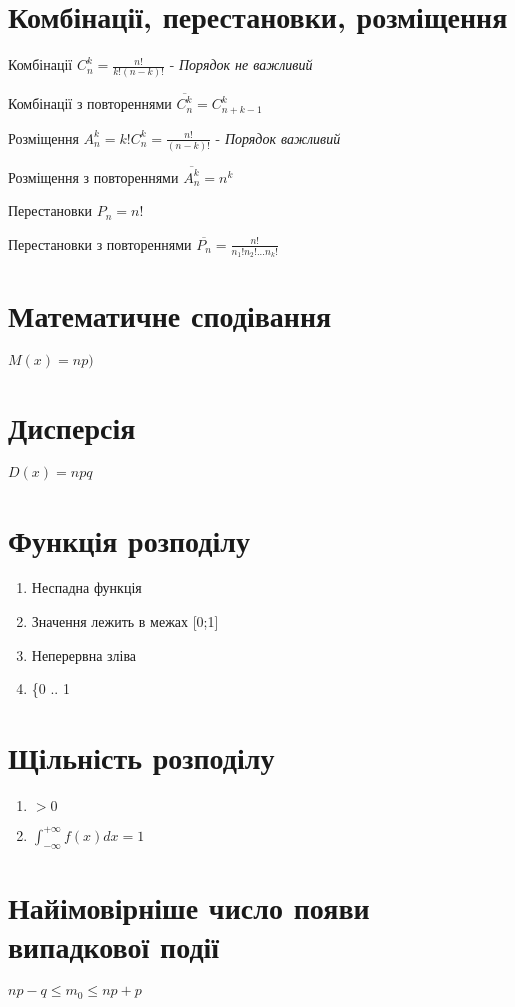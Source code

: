 \documentclass{article}
\begin{document}
\begin{Large}
\section*{Комбінації, перестановки, розміщення}
\begin{list}{-}{}
	\item Комбінації $C_n^k=\frac{n!}{k!(n-k)!}$ - \textit{Порядок не важливий}
	\item Комбінації з повтореннями $\overline{C_n^k}=C_{n+k-1}^k$
	\item Розміщення $A_n^k=k!C_n^k=\frac{n!}{(n-k)!}$ - \textit{Порядок важливий}
	\item Розміщення з повтореннями $\overline{A_n^k}=n^k$
	\item Перестановки $P_n=n!$
	\item Перестановки з повтореннями $\overline{P_n}=\frac{n!}{n_1!n_2!...n_k!}$
\end{list}

\section*{Математичне сподівання}
$M(x)=np)$
\section*{Дисперсія}
$D(x)=npq$

\section*{Функція розподілу}
\begin{enumerate}
	\item Неспадна функція
	\item Значення лежить в межах [0;1]
	\item Неперервна зліва
	\item \{0 .. 1
\end{enumerate}

\section*{Щільність розподілу}
\begin{enumerate}
	\item $> 0$
	\item $\int_{-\infty}^{+\infty}f(x)dx = 1$
\end{enumerate}

\section*{Найімовірніше число появи випадкової події}
$np-q\le m_0 \le np+p$


\end{Large}
\end{document}
